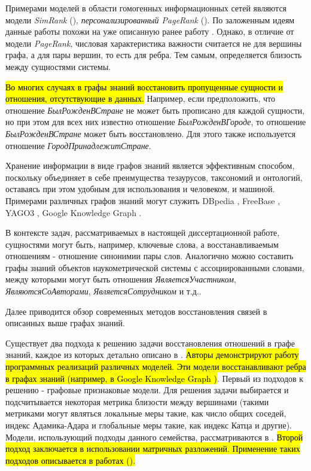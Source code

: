 Примерами моделей в области гомогенных информационных сетей являются модели \emph{SimRank} (\cite{simrank}), \emph{персонализированный PageRank} (\cite{ppagerank}). По заложенным идеям данные работы похожи на уже описанную ранее работу \cite{pagerank}. Однако, в отличие от модели \emph{PageRank}, числовая характеристика важности считается не для вершины графа, а для пары вершин, то есть для ребра. Тем самым, определяется близость между сущностями системы.
    

\hl{Во многих случаях в графы знаний восстановить пропущенные сущности и отношения, отсутствующие в данных.} Например, если предположить, что отношение \emph{БылРожденВСтране} не может быть прописано для каждой сущности, но при этом для всех них известно отношение \emph{БылРожденВГороде}, то отношение \emph{БылРожденВСтране} может быть восстановлено. Для этого также используется отношение \emph{ГородПринадлежитСтране}. 

Хранение информации в виде графов знаний является эффективным способом, поскольку объединяет в себе преимущества тезаурусов, таксономий и онтологий, оставаясь при этом удобным для использования и человеком, и машиной.  Примерами различных графов знаний могут служить DBpedia \cite{dbpedia}, FreeBase \cite{freebase}, YAGO3 \cite{yago3}, Google Knowledge Graph \cite{google_kg}. 

В контексте задач, рассматриваемых в настоящей диссертационной работе, сущностями могут быть, например, ключевые слова, а восстанавливаемым отношениям - отношение синонимии пары слов. Аналогично можно составить графы знаний объектов наукометрической системы с ассоциированными словами, между которыми могут быть отношения \emph{ЯвляетсяУчастником}, \emph{ЯвляютсяСоАвторами}, \emph{ЯвляетсяСотрудником} и т.д..

Далее приводится обзор современных методов восстановления связей в описанных выше графах знаний.

Существует два подхода к решению задачи восстановления отношений в графе знаний, каждое из которых детально описано в \cite{rel_ml}. \hl{Авторы демонстрируют работу программных реализаций различных моделей. Эти модели восстанавливают ребра в графах знаний (например, в Google Knowledge Graph \cite{google_kg})}. Первый из подходов к решению - графовые признаковые модели. Для решения задачи выбирается и подсчитывается некоторая метрика близости между вершинами (такими метриками могут являться локальные меры такие, как число общих соседей, индекс Адамика-Адара и глобальные меры такие, как индекс Катца и другие). Модели, использующий подходы данного семейства, рассматриваются в \cite{Adamic, Barabasi, RePEc, Leicht}. \hl{Второй подход заключается в использовании матричных разложений. Применение таких подходов описывается в работах (\cite{decomp,tens_decomp}).}

